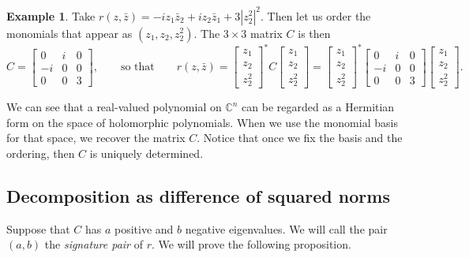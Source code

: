 \documentclass[12pt,openany]{book}
\newcommand{\abs}[1]{\left\lvert {#1} \right\rvert}
\newcommand{\C}{{\mathbb{C}}}
\newcommand{\myindex}[1]{#1\index{#1}}
\theoremstyle{plain}
\theoremstyle{remark}
\theoremstyle{definition}
\theoremstyle{exercise}
\theoremstyle{example}
\newtheorem{example}[thm]{Example}
\begin{document}
\begin{example}
Take $r(z,\bar{z}) = -i z_1 \bar{z}_2 + i z_2 \bar{z}_1 + 3 \abs{z_2^2}^2$.
Then let us order the monomials that appear as $(z_1,z_2,z_2^2)$.  The $3
\times 3$ matrix $C$ is then
\begin{equation}
C = 
\begin{bmatrix}
0  & i & 0 \\
-i & 0 & 0 \\
0  & 0 & 3
\end{bmatrix} ,
\qquad
\text{so that}
\qquad
r(z,\bar{z}) = 
\begin{bmatrix}
z_1 \\ z_2 \\ z_2^2
\end{bmatrix}^*
C
\begin{bmatrix}
z_1 \\ z_2 \\ z_2^2
\end{bmatrix}
=
\begin{bmatrix}
z_1 \\ z_2 \\ z_2^2
\end{bmatrix}^*
\begin{bmatrix}
0  & i & 0 \\
-i & 0 & 0 \\
0  & 0 & 3
\end{bmatrix} 
\begin{bmatrix}
z_1 \\ z_2 \\ z_2^2
\end{bmatrix} .
\end{equation}
\end{example}

We can see that a real-valued 
polynomial on $\C^n$ can be regarded as a Hermitian form on the space of 
holomorphic polynomials.  When we use the monomial basis for that space,
we recover the matrix $C$.  Notice that once we fix the basis and the
ordering, then $C$ is uniquely determined.

\subsection{Decomposition as difference of squared norms}

Suppose that $C$ has $a$ positive and $b$ negative eigenvalues.
We will call the pair $(a,b)$ the \emph{\myindex{signature pair}} of $r$.
We will prove the following proposition.
\end{document}
